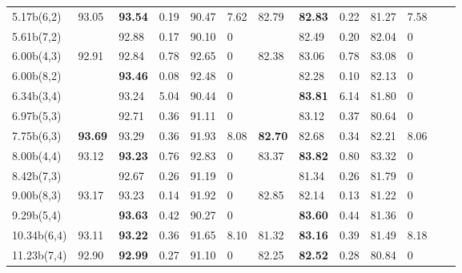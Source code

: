 \documentclass{article}
\theoremstyle{definition}
\theoremstyle{remark}
\begin{document}
\begin{table}[]
\begin{tabular}{|p{1.1cm}| 
    p{0.6cm}| p{0.6cm}| p{0.6cm} |
    p{0.6cm} |p{0.6cm}| p{0.6cm}| 
    p{0.6cm}| p{0.6cm} |p{0.6cm} |
    p{0.6cm}|p{0.6cm}|p{0.6cm}|}
5.17b(6,2)   & \multirow{2}{*}{93.05} &	\textbf{93.54}	& 0.19      &  90.47 &	7.62 	& \multirow{2}{*}{82.79} & \textbf{82.83} &	0.22  & 81.27	& 7.58   \\
5.61b(7,2)   &                        &	92.88	& 0.17      &  90.10 &	0 		&                        & 82.49 &	0.20  & 82.04	& 0   \\ \cline{2-2} \cline{7-7}
6.00b(4,3)   & \multirow{4}{*}{92.91} &	92.84	& 0.78      &  92.65 &	0 		& \multirow{4}{*}{82.38} & 83.06 &	0.78  & 83.08	& 0   \\
6.00b(8,2)   &                        &	\textbf{93.46}	& 0.08      &  92.48 &	0 		&                        & 82.28 &	0.10  & 82.13	& 0   \\
6.34b(3,4)   &                        &	93.24	& 5.04      &  90.44 &	0 		&                        & \textbf{83.81} &	6.14  & 81.80	& 0   \\
6.97b(5,3)   &                        &	92.71	& 0.36      &  91.11 &	0 		&                        & 83.12 &	0.37  & 80.64	& 0   \\ \cline{2-2} \cline{7-7}
7.75b(6,3)   & \textbf{93.69}                  &	93.29	& 0.36      &  91.93 &	8.08 & \textbf{82.70}                  & 82.68 &	0.34  & 82.21	& 8.06  \\ \cline{2-2} \cline{7-7}
8.00b(4,4)   & \multirow{2}{*}{93.12} &	\textbf{93.23}	& 0.76      &  92.83 &	0 		& \multirow{2}{*}{83.37} & \textbf{83.82} &	0.80  & 83.32	& 0   \\
8.42b(7,3)   &                        &	92.67	& 0.26      &  91.19 &	0 		&                        & 81.34 &	0.26  & 81.79	& 0   \\ \cline{2-2} \cline{7-7}
9.00b(8,3)   & \multirow{2}{*}{93.17} &	93.23	& 0.14      &  91.92 &	0 		& \multirow{2}{*}{82.85} & 82.14 &	0.13  & 81.22	& 0   \\
9.29b(5,4)   &                        &	\textbf{93.63}	& 0.42      &  90.27 &	0 		&                        & \textbf{83.60} &	0.44  & 81.36	& 0   \\ \cline{2-2} \cline{7-7}
10.34b(6,4)  & 93.11                  &	\textbf{93.22}   & 0.36      &  91.65 &	8.10	& 81.32                  & \textbf{83.16} &	0.39  & 81.49	& 8.18 \\ \cline{2-2} \cline{7-7}
11.23b(7,4)  & 92.90                  &	\textbf{92.99}   & 0.27      &  91.10 &	0 		& 82.25                  & \textbf{82.52} &	0.28  & 80.84	& 0   \\ \cline{2-2} \cline{7-7}

\end{tabular}
\end{table}
\end{document}
